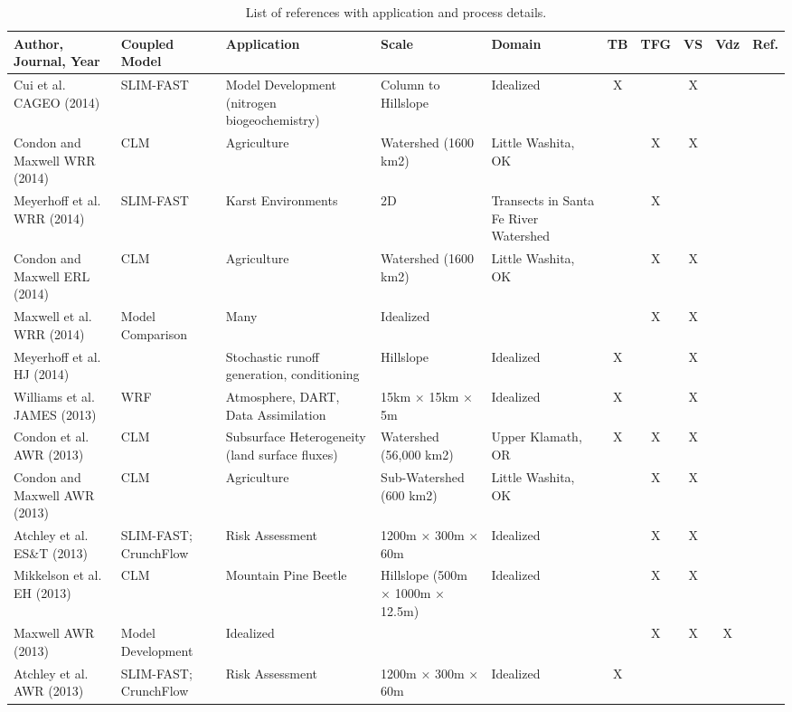 {\scriptsize
\begin{table}
\renewcommand{\arraystretch}{2.5}
\center
\caption{List of \parflow{} references with application and process details.}
\begin{tabular}{ l  p{1.5cm} p{2cm} p{1.5cm} p{1.5cm} | c | c | c | c | c }
\bf{Author, Journal, Year} & \bf{Coupled Model} & \bf{Application} & \bf{Scale} & \bf{Domain} & \bf{TB} & \bf{TFG} & \bf{VS} & \bf{Vdz} & \bf{Ref.} \\   
\hline{}
Cui et al. CAGEO (2014) & SLIM-FAST & Model Development (nitrogen biogeochemistry) & Column to Hillslope & Idealized & X &   & X &  & \cite{Cui14}  \\
Condon and Maxwell WRR (2014) & CLM & Agriculture & Watershed (1600 km2) & Little Washita, OK &  & X& X & & \cite{Condon14b}  \\
Meyerhoff et al. WRR (2014) & SLIM-FAST & Karst Environments & 2D & Transects in Santa Fe River Watershed & & X & & & \cite{Meyerhoff14b}  \\
Condon and Maxwell ERL (2014) & CLM & Agriculture & Watershed (1600 km2) & Little Washita, OK & & X & X & & \cite{Condon14a}  \\
Maxwell et al. WRR (2014) & Model Comparison & Many  & Idealized  &   &   & X  & X  & & \cite{Maxwell14}   \\ 
Meyerhoff et al. HJ (2014) &  & Stochastic runoff generation, conditioning & Hillslope & Idealized & X & &X & & \cite{Meyerhoff14a}  \\
Williams et al. JAMES (2013) & WRF & Atmosphere, DART, Data Assimilation & 15km × 15km × 5m & Idealized & X & & X & & \cite{Williams13}  \\
Condon et al. AWR (2013) & CLM & Subsurface Heterogeneity (land surface fluxes) & Watershed (56,000 km2) & Upper Klamath, OR & X & X & X & & \cite{Condon13b}  \\
Condon and Maxwell AWR (2013) & CLM & Agriculture & Sub-Watershed (600 km2) & Little Washita, OK &  & X & X & & \cite{Condon13a} \\
Atchley et al. ES\&T (2013) & SLIM-FAST; CrunchFlow & Risk Assessment & 1200m × 300m × 60m & Idealized &  & X & X & & \cite{Atchley13b}  \\
Mikkelson et al. EH (2013) & CLM & Mountain Pine Beetle & Hillslope (500m × 1000m × 12.5m) & Idealized &  & X & X & & \cite{Mikkelson13}   \\
Maxwell AWR (2013) & Model Development & Idealized & & & & X & X & X & \cite{Maxwell13} \\
Atchley et al. AWR (2013) & SLIM-FAST; CrunchFlow & Risk Assessment & 1200m × 300m × 60m & Idealized & X &  &  & & \cite{Atchley13a}   \\ 
\end{tabular}
\label{pfref1}
\end{table}

}
